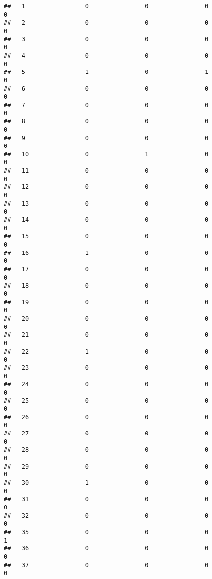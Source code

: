 \documentclass[]{article}
\begin{document}
\begin{verbatim}
##   1                 0                0                0                0
##   2                 0                0                0                0
##   3                 0                0                0                0
##   4                 0                0                0                0
##   5                 1                0                1                0
##   6                 0                0                0                0
##   7                 0                0                0                0
##   8                 0                0                0                0
##   9                 0                0                0                0
##   10                0                1                0                0
##   11                0                0                0                0
##   12                0                0                0                0
##   13                0                0                0                0
##   14                0                0                0                0
##   15                0                0                0                0
##   16                1                0                0                0
##   17                0                0                0                0
##   18                0                0                0                0
##   19                0                0                0                0
##   20                0                0                0                0
##   21                0                0                0                0
##   22                1                0                0                0
##   23                0                0                0                0
##   24                0                0                0                0
##   25                0                0                0                0
##   26                0                0                0                0
##   27                0                0                0                0
##   28                0                0                0                0
##   29                0                0                0                0
##   30                1                0                0                0
##   31                0                0                0                0
##   32                0                0                0                0
##   35                0                0                0                1
##   36                0                0                0                0
##   37                0                0                0                0

\end{verbatim}
\end{document}
